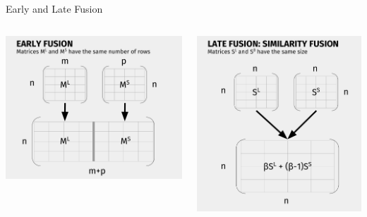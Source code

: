 \documentclass[10pt,xcolor=table]{beamer}
\begin{document}
\begin{frame}{Early and Late Fusion}
\begin{center}
\end{center}
\begin{columns}
	\begin{minipage}[c][0.5\textheight][c]{\linewidth}
		\centering
		\includegraphics[width=1\linewidth]{image2/Chapitre3/ef_diag}
		\end{minipage}
	\begin{minipage}[c][0.5\textheight][c]{\linewidth}
		\centering
	  	\includegraphics[width=1\linewidth]{image2/Chapitre3/lf2_diag.pdf}
	\end{minipage}
\end{columns}




\end{frame}
\end{document}
